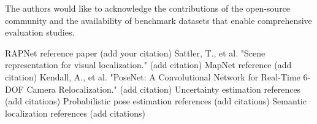 \documentclass[11pt,a4paper]{article}
\begin{document}
The authors would like to acknowledge the contributions of the open-source community and the availability of benchmark datasets that enable comprehensive evaluation studies.

\begin{thebibliography}{99}
 RAPNet reference paper (add your citation)
 Sattler, T., et al. "Scene representation for visual localization." (add citation)
 MapNet reference (add citation)
 Kendall, A., et al. "PoseNet: A Convolutional Network for Real-Time 6-DOF Camera Relocalization." (add citation)
 Uncertainty estimation references (add citations)
 Probabilistic pose estimation references (add citations)
 Semantic localization references (add citations)
\end{thebibliography}
\end{document}
